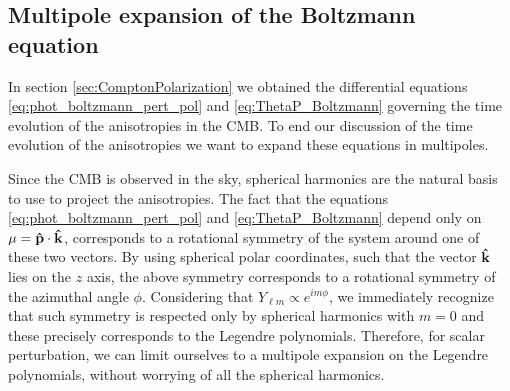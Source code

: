 \subsection{Multipole expansion of the Boltzmann equation}\label{sec:BoltzmannMultipoleExpansion}
In section \ref{sec:ComptonPolarization} we obtained the differential equations \eqref{eq:phot_boltzmann_pert_pol} and \eqref{eq:ThetaP_Boltzmann} governing the time evolution of the anisotropies in the CMB. To end our discussion of the time evolution of the anisotropies we want to expand these equations in multipoles.

Since the CMB is observed in the sky, spherical harmonics are the natural basis to use to project the anisotropies. The fact that the equations \eqref{eq:phot_boltzmann_pert_pol} and \eqref{eq:ThetaP_Boltzmann} depend only on $\mu=\mathbf{\hat{p}}\cdot\mathbf{\hat{k}}$, corresponds to a rotational symmetry of the system around one of these two vectors. By using spherical polar coordinates, such that the vector $\mathbf{\hat{k}}$ lies on the $z$ axis, the above symmetry corresponds to a rotational symmetry of the azimuthal angle $\phi$. Considering that $Y_{\ell m}\propto e^{im\phi}$, we immediately recognize that such symmetry is respected only by spherical harmonics with $m=0$ and these precisely corresponds to the Legendre polynomials. Therefore, for scalar perturbation, we can limit ourselves to a multipole expansion on the Legendre polynomials, without worrying of all the spherical harmonics.

